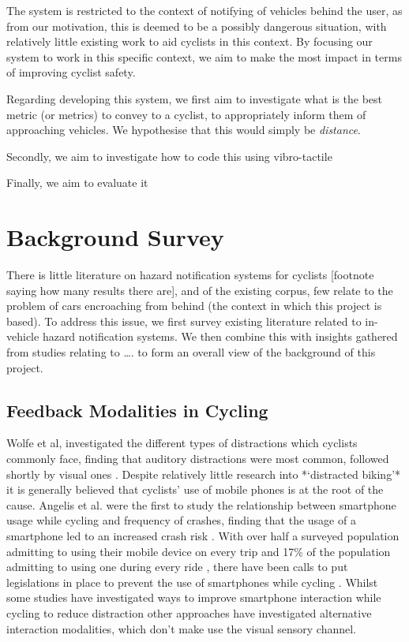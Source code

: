 \documentclass{interim}
\begin{document}
The system is restricted to the context of notifying of vehicles behind the user, as from our motivation, this is deemed to be a possibly dangerous situation, with relatively little existing work to aid cyclists in this context. By focusing our system to work in this specific context, we aim to make the most impact in terms of improving cyclist safety.

Regarding developing this system, we first aim to investigate what is the best metric (or metrics) to convey to a cyclist, to appropriately inform them of approaching vehicles. We hypothesise that this would simply be \textit{distance}. 

Secondly, we aim to investigate how to code this using vibro-tactile

Finally, we aim to evaluate it


\section{Background Survey}
There is little literature on hazard notification systems for cyclists [footnote saying how many results there are], and of the existing corpus, few relate to the problem of cars encroaching from behind (the context in which this project is based). To address this issue, we first survey existing literature related to in-vehicle hazard notification systems. We then combine this with insights gathered from studies relating to …. to form an overall view of the background of this project.

\subsection{Feedback Modalities in Cycling}
Wolfe et al, investigated the different types of distractions which cyclists commonly face, finding that auditory distractions were most common, followed shortly by visual ones \cite{wolfe2016distracted}. Despite relatively little research into *‘distracted biking’* \cite{mwakalonge2014distracted} it is generally believed that cyclists’ use of mobile phones is at the root of the cause. Angelis et al. were the first to study the relationship between smartphone usage while cycling and frequency of crashes, finding that the usage of a smartphone led to an increased crash risk \cite{doi:10.1080/19439962.2019.1591559}. With over half a surveyed population admitting to using their mobile device on every trip \cite{GOLDENBELD20121} and 17\% of the population admitting to using one during every ride \cite{goldenbeld2010use}, there have been calls to put legislations in place to prevent the use of smartphones while cycling \cite{banphoneuse}. Whilst some studies have investigated ways to improve smartphone interaction while cycling to reduce distraction \cite{10.1145/3544548.3580971, 10.1145/3152832.3152871} other approaches have investigated alternative interaction modalities, which don’t make use the visual sensory channel.
\end{document}
